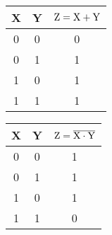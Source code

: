 \begin{figure}[h]
  \def\@captype{table}
  \begin{minipage}[t]{.48\textwidth}
    \begin{center}
      \begin{tabular}{ccc}
        \hline
        X & Y & $\rm Z=X+ Y$\\
        \hline
        0 & 0 & 0\\
        0 & 1 & 1\\
        1 & 0 & 1\\
        1 & 1 & 1\\
        \hline
      \end{tabular}
    \end{center}
    \label{tab:orgate}
  \end{minipage}
  \hfill
  \begin{minipage}[c]{.48\textwidth}
  \end{minipage}
\end{figure}
\begin{figure}[h]
  \def\@captype{table}
  \begin{minipage}[t]{.48\textwidth}
    \begin{center}
      \begin{tabular}{ccc}
        \hline
        X & Y & $\rm Z=\overline{X\cdot Y}$\\
        \hline
        0 & 0 & 1\\
        0 & 1 & 1\\
        1 & 0 & 1\\
        1 & 1 & 0\\
        \hline
      \end{tabular}
    \end{center}
    \label{tab:nandgate}
  \end{minipage}
  \hfill
  \begin{minipage}[c]{.48\textwidth}
  \end{minipage}
\end{figure}
